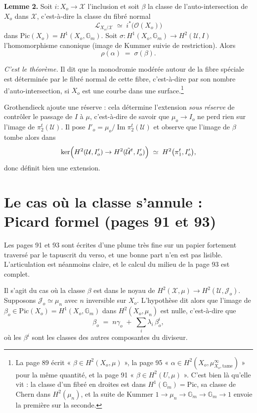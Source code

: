 \documentclass[11pt,a4paper]{article}
\begin{document}
\textbf{Lemme 2.} Soit $i : X_{o} \to \mathcal{X}$ l'inclusion et soit $\beta$
la classe de l'auto-intersection de $X_{o}$ dans $\mathcal{X}$, c'est-à-dire la
classe du fibré normal
\[
  \mathcal{L}_{X_{o}/\mathcal{X}} \;\simeq\; i^{*}\bigl(\mathcal{O}(X_{o})\bigr)
\]
dans $\mathrm{Pic}(X_{o}) = H^{1}(X_{o}, \mathbb{G}_{m})$. Soit
$\sigma : H^{1}(X_{o}, \mathbb{G}_{m}) \to H^{2}(\mathcal{U}, I)$
l'homomorphisme canonique (image de Kummer suivie de restriction). Alors
\[
  \rho(\alpha) \;=\; \sigma(\beta) .
\]

\emph{C'est le théorème.} Il dit que la monodromie modérée autour de la fibre
spéciale est déterminée par le fibré normal de cette fibre, c'est-à-dire par
son nombre d'auto-intersection, si $X_{o}$ est une courbe dans une
surface.\footnote{La page 89 écrit « $\beta \in H^{2}(X_{o}, \mu)$ », la page
95 « $\alpha \in H^{2}(X_{o}, \mu^{\infty}_{X_{o},\mathrm{tame}})$ » pour la
même quantité, et la page 91 « $\beta \in H^{2}(U, \mu)$ ». C'est bien là
qu'elle vit : la classe d'un fibré en droites est dans
$H^{1}(\mathbb{G}_{m}) = \mathrm{Pic}$, sa classe de Chern dans
$H^{2}(\mu_{n})$, et la suite de Kummer
$1 \to \mu_{n} \to \mathbb{G}_{m} \to \mathbb{G}_{m} \to 1$ envoie la première
sur la seconde.}

Grothendieck ajoute une réserve : cela détermine l'extension
\emph{sous réserve} de contrôler le passage de $I$ à $\mu$, c'est-à-dire de
savoir que $\mu_{o} \to I_{o}$ ne perd rien sur l'image de
$\pi_{2}^{t}(\mathcal{U})$. Il pose $I'_{o} = \mu_{o}/\operatorname{Im}
\pi_{2}^{t}(\mathcal{U})$ et observe que l'image de $\beta$ tombe alors dans
\[
  \ker\Bigl(H^{2}(\mathcal{U}, I'_{o}) \to
  H^{2}(\tilde{\mathcal{U}}^{t}, I'_{o})\Bigr) \;\simeq\;
  H^{2}\bigl(\pi_{1}^{t}, I'_{o}\bigr) ,
\]
donc définit bien une extension.

\section*{Le cas où la classe s'annule : Picard formel (pages 91 et 93)}

Les pages 91 et 93 sont écrites d'une plume très fine sur un papier fortement
traversé par le tapuscrit du verso, et une bonne part n'en est pas lisible.
L'articulation est néanmoins claire, et le calcul du milieu de la page 93 est
complet.

Il s'agit du cas où la classe $\beta$ est dans le noyau de
$H^{2}(\mathcal{X}, \mu) \to H^{2}(\mathcal{U}, \mathcal{J}_{o})$. Supposons
$\mathcal{J}_{o} \simeq \mu_{n}$ avec $n$ inversible sur $X_{o}$. L'hypothèse
dit alors que l'image de
$\beta_{o} \in \mathrm{Pic}(X_{o}) = H^{1}(X_{o}, \mathbb{G}_{m})$ dans
$H^{2}(X_{o}, \mu_{n})$ est nulle, c'est-à-dire que
\[
  \beta_{o} \;=\; n\gamma_{o} \;+\; \sum_{i} \lambda_{i}\,\beta_{o}^{i} ,
\]
où les $\beta^{i}$ sont les classes des autres composantes du diviseur.
\end{document}
